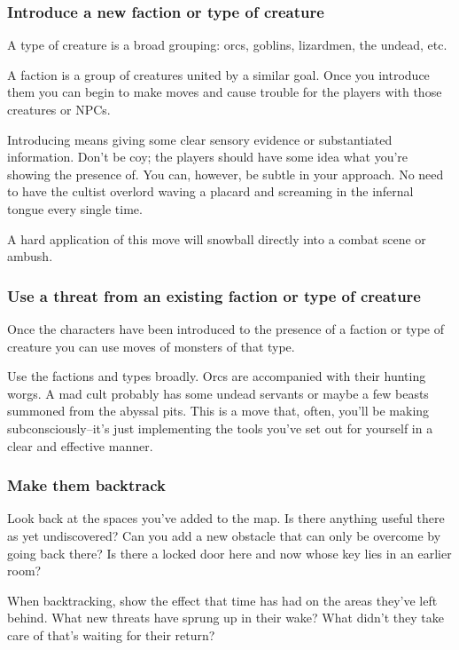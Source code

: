 \subsubsection{Introduce a new faction or type of creature}

A type of creature is a broad grouping: orcs, goblins, lizardmen, the undead, etc.

A faction is a group of creatures united by a similar goal. Once you introduce them you can begin to make moves and cause trouble for the players with those creatures or NPCs.

Introducing means giving some clear sensory evidence or substantiated information. Don't be coy; the players should have some idea what you're showing the presence of. You can, however, be subtle in your approach. No need to have the cultist overlord waving a placard and screaming in the infernal tongue every single time.

A hard application of this move will snowball directly into a combat scene or ambush.
\subsubsection{Use a threat from an existing faction or type of creature}

Once the characters have been introduced to the presence of a faction or type of creature you can use moves of monsters of that type.

Use the factions and types broadly. Orcs are accompanied with their hunting worgs. A mad cult probably has some undead servants or maybe a few beasts summoned from the abyssal pits. This is a move that, often, you'll be making subconsciously--it's just implementing the tools you've set out for yourself in a clear and effective manner.
\subsubsection{Make them backtrack}

Look back at the spaces you've added to the map. Is there anything useful there as yet undiscovered? Can you add a new obstacle that can only be overcome by going back there? Is there a locked door here and now whose key lies in an earlier room?

When backtracking, show the effect that time has had on the areas they've left behind. What new threats have sprung up in their wake? What didn't they take care of that's waiting for their return?

